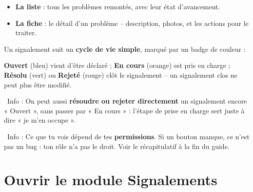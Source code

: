 \documentclass[12pt,a4paper]{article}
\newcommand{\info}[1]{\par\noindent\textcolor{lagoon}{\faInfoCircle\ Info : #1}\par}
\begin{document}
\begin{itemize}[label=\textcolor{lagoon}{\faExclamationCircle}]
  \item \textbf{La liste} : tous les problèmes remontés, avec leur état d'avancement.
  \item \textbf{La fiche} : le détail d'un problème -- description, photos, et les actions pour le traiter.
\end{itemize}

Un signalement suit un \textbf{cycle de vie simple}, marqué par un badge de couleur :

\begin{center}
\end{center}

\textbf{Ouvert} (bleu) vient d'être déclaré ; \textbf{En cours} (orange) est pris en charge ; \textbf{Résolu} (vert) ou \textbf{Rejeté} (rouge) clôt le signalement -- un signalement clos ne peut plus être modifié.

\info{On peut aussi \textbf{résoudre ou rejeter directement} un signalement encore « Ouvert », sans passer par « En cours » : l'étape de prise en charge sert juste à dire « je m'en occupe ».}

\info{Ce que tu vois dépend de tes \textbf{permissions}. Si un bouton manque, ce n'est pas un bug : ton rôle n'a pas le droit. Voir le récapitulatif à la fin du guide.}

\newpage

\section{Ouvrir le module Signalements}\label{sec:ouvrir}
\end{document}
